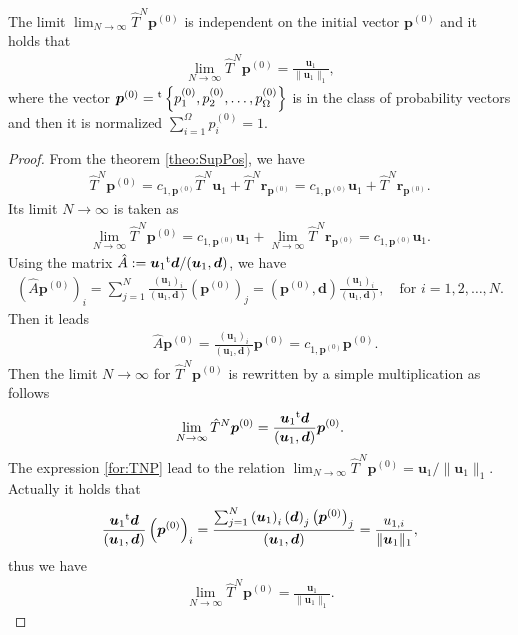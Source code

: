 \begin{theorem}
	The limit $\lim_{N\to\infty}\hat{T}^{N}\bm{p}^{(0)}$ is independent on the initial vector $\bm{p}^{(0)}$ and it holds that
	\begin{align}
	\lim_{N\to\infty}\hat{T}^{N}\bm{p}^{(0)} = \frac{\bm{u}_{1}}{\|\bm{u}_{1}\|_{1}},
	\end{align}
	where the vector $\bm{p}^{(0)}={}^{\rm t}\left\{p^{(0)}_{1}, p^{(0)}_{2}, \dots, p^{(0)}_{\Omega}\right\}$ is in the class of probability vectors and then it is normalized $\sum_{i=1}^{\Omega}p^{(0)}_{i} = 1$.
\end{theorem}

\begin{proof}
	From the theorem \ref{theo:SupPos}, we have
	\begin{align}
	\hat{T}^{N}\bm{p}^{(0)} = c_{1,\bm{p}^{(0)}}\hat{T}^{N}\bm{u}_{1} + \hat{T}^{N}\bm{r}_{\bm{p}^{(0)}} = c_{1,\bm{p}^{(0)}}\bm{u}_{1} + \hat{T}^{N}\bm{r}_{\bm{p}^{(0)}}.
	\end{align}
	Its limit $N\to\infty$ is taken as
	\begin{align}
	\lim_{N\to\infty}\hat{T}^{N}\bm{p}^{(0)} = c_{1,\bm{p}^{(0)}}\bm{u}_{1} + \lim_{N\to\infty}\hat{T}^{N}\bm{r}_{\bm{p}^{(0)}} = c_{1,\bm{p}^{(0)}}\bm{u}_{1}.
	\end{align}
	Using the matrix $\hat{A}:=\bm{u}_{1}{}^{\rm t}\bm{d}/(\bm{u}_{1},\bm{d})$, we have
	\begin{align}
	\left(\hat{A}\bm{p}^{(0)}\right)_{i} = \sum_{j = 1}^{N}\frac{\left(\bm{u}_{1}\right)_{i}}{(\bm{u}_{1},\bm{d})}\left(\bm{p}^{(0)}\right)_{j} = \left(\bm{p}^{(0)},\bm{d}\right)\frac{\left(\bm{u}_{1}\right)_{i}}{(\bm{u}_{1},\bm{d})},\quad\text{for $i=1,2,\dots,N$}.
	\end{align}
	Then it leads
	\begin{align}
	& \hat{A}\bm{p}^{(0)} = \frac{\left(\bm{u}_{1}\right)_{i}}{(\bm{u}_{1},\bm{d})}\bm{p}^{(0)} = c_{1,\bm{p}^{(0)}}\bm{p}^{(0)}.
	\end{align}
	Then the limit $N\to\infty$ for $\hat{T}^{N}\bm{p}^{(0)}$ is rewritten by a simple multiplication as follows
	\begin{align}
	\lim_{N\to\infty}\hat{T}^{N}\bm{p}^{(0)} = \frac{\bm{u}_{1}{}^{\rm t}\bm{d}}{(\bm{u}_{1},\bm{d})}\bm{p}^{(0)}.\label{for:TNP}
	\end{align}
	The expression \eqref{for:TNP} lead to the relation $\lim_{N\to\infty}\hat{T}^{N}\bm{p}^{(0)} = \bm{u}_{1}/\|\bm{u}_{1}\|_{1}$. Actually it holds that
	\begin{align}
	\frac{\bm{u}_{1}{}^{\rm t}\bm{d}}{(\bm{u}_{1},\bm{d})}\left(\bm{p}^{(0)}\right)_{i} = \frac{\sum_{j=1}^{N}\left(\bm{u}_{1}\right)_{i}\left(\bm{d}\right)_{j}\left(\bm{p}^{(0)}\right)_{j}}{(\bm{u}_{1},\bm{d})} = \frac{u_{1,i}}{\|\bm{u}_{1}\|_{1}},
	\end{align}
	thus we have
	\begin{align}
	\lim_{N\to\infty}\hat{T}^{N}\bm{p}^{(0)} = \frac{\bm{u}_{1}}{\|\bm{u}_{1}\|_{1}}.
	\end{align}
\end{proof}

